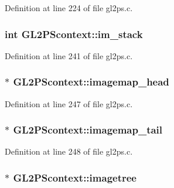 Definition at line 224 of file gl2ps.\+c.

\hypertarget{struct_g_l2_p_scontext_a5b14e3c2ba9f96921e5592a441f2c54d}{}
\subsubsection[{im\+\_\+stack}]{\setlength{\rightskip}{0pt plus 5cm}int G\+L2\+P\+Scontext\+::im\+\_\+stack}\label{struct_g_l2_p_scontext_a5b14e3c2ba9f96921e5592a441f2c54d}


Definition at line 241 of file gl2ps.\+c.

\hypertarget{struct_g_l2_p_scontext_a1fe935723116b751c65a1f9b170366df}{}
\subsubsection[{imagemap\+\_\+head}]{$\ast$ G\+L2\+P\+Scontext\+::imagemap\+\_\+head}\label{struct_g_l2_p_scontext_a1fe935723116b751c65a1f9b170366df}


Definition at line 247 of file gl2ps.\+c.

\hypertarget{struct_g_l2_p_scontext_a2b46299e500bbcb64d6ef437b113ea07}{}
\subsubsection[{imagemap\+\_\+tail}]{$\ast$ G\+L2\+P\+Scontext\+::imagemap\+\_\+tail}\label{struct_g_l2_p_scontext_a2b46299e500bbcb64d6ef437b113ea07}


Definition at line 248 of file gl2ps.\+c.

\hypertarget{struct_g_l2_p_scontext_ac63c39de233a26b41bfab24a543dfa6f}{}
\subsubsection[{imagetree}]{$\ast$ G\+L2\+P\+Scontext\+::imagetree}\label{struct_g_l2_p_scontext_ac63c39de233a26b41bfab24a543dfa6f}


